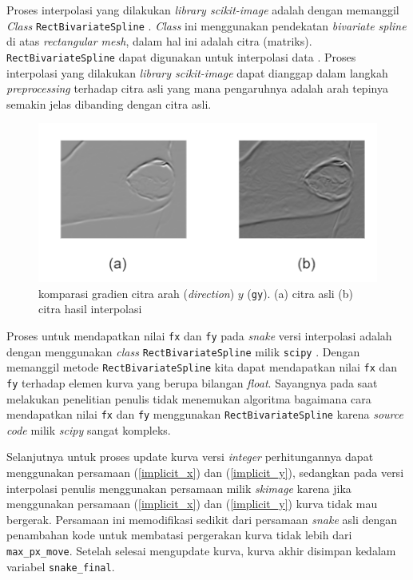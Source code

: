 Proses interpolasi yang dilakukan \emph{library scikit-image} adalah dengan memanggil \emph{Class} \texttt{RectBivariateSpline} \citep{acm}. \emph{Class} ini menggunakan pendekatan \emph{bivariate spline} di atas \emph{rectangular mesh}, dalam hal ini adalah citra (matriks). \texttt{RectBivariateSpline} dapat digunakan untuk interpolasi data \citep{rbs}. Proses interpolasi yang dilakukan \emph{library scikit-image} dapat dianggap dalam langkah \emph{preprocessing} terhadap citra asli yang mana pengaruhnya adalah arah tepinya semakin jelas dibanding dengan citra asli.
\begin{figure}[H]
	\centering
	\includegraphics[width=1\textwidth]{gambar/compare_ori_interp}
	\caption{komparasi gradien citra arah (\emph{direction}) $y$ (\texttt{gy}). (a) citra asli (b) citra hasil interpolasi}
	\label{Gambar:compare_ori_interp}
\end{figure}
Proses untuk mendapatkan nilai \texttt{fx} dan \texttt{fy} pada \emph{snake} versi interpolasi adalah dengan menggunakan \emph{class} \texttt{RectBivariateSpline} milik \texttt{scipy} \citep{rbs}. Dengan memanggil metode \texttt{RectBivariateSpline} kita dapat mendapatkan nilai \texttt{fx} dan \texttt{fy} terhadap elemen kurva yang berupa bilangan \emph{float}. Sayangnya pada saat melakukan penelitian penulis tidak menemukan algoritma bagaimana cara mendapatkan nilai \texttt{fx} dan \texttt{fy} menggunakan \texttt{RectBivariateSpline} karena \emph{source code} milik \emph{scipy} sangat kompleks.

Selanjutnya untuk proses update kurva versi \emph{integer} perhitungannya dapat menggunakan persamaan (\ref{implicit_x}) dan (\ref{implicit_y}), sedangkan pada versi interpolasi penulis menggunakan persamaan milik \emph{skimage} \citep{acm} karena jika menggunakan persamaan (\ref{implicit_x}) dan (\ref{implicit_y}) kurva tidak mau bergerak. Persamaan ini memodifikasi sedikit dari persamaan \emph{snake} asli dengan penambahan kode untuk membatasi pergerakan kurva tidak lebih dari \texttt{max\_px\_move}. Setelah selesai mengupdate kurva, kurva akhir disimpan kedalam variabel \texttt{snake\_final}.

